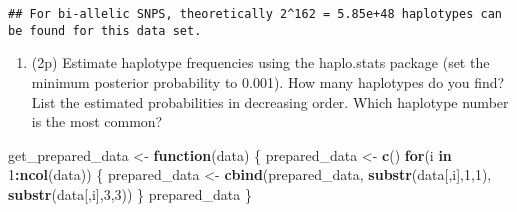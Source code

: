 \documentclass[
]{article}
\newenvironment{Shaded}{\begin{snugshade}}{\end{snugshade}}
\newcommand{\ControlFlowTok}[1]{\textcolor[rgb]{0.13,0.29,0.53}{\textbf{#1}}}
\newcommand{\DecValTok}[1]{\textcolor[rgb]{0.00,0.00,0.81}{#1}}
\newcommand{\KeywordTok}[1]{\textcolor[rgb]{0.13,0.29,0.53}{\textbf{#1}}}
\newcommand{\NormalTok}[1]{#1}
\newcommand{\OperatorTok}[1]{\textcolor[rgb]{0.81,0.36,0.00}{\textbf{#1}}}
\newcommand{\StringTok}[1]{\textcolor[rgb]{0.31,0.60,0.02}{#1}}
\providecommand{\tightlist}{%
  \setlength{\itemsep}{0pt}\setlength{\parskip}{0pt}}
\begin{document}
\begin{verbatim}
## For bi-allelic SNPS, theoretically 2^162 = 5.85e+48 haplotypes can be found for this data set.
\end{verbatim}

\begin{enumerate}
\def\labelenumi{\arabic{enumi}.}
\setcounter{enumi}{3}
\tightlist
\item
  (2p) Estimate haplotype frequencies using the haplo.stats package (set
  the minimum posterior probability to 0.001). How many haplotypes do
  you find? List the estimated probabilities in decreasing order. Which
  haplotype number is the most common?
\end{enumerate}

\begin{Shaded}
\begin{Highlighting}[]
\NormalTok{get_prepared_data <-}\StringTok{ }\ControlFlowTok{function}\NormalTok{(data) \{}
\NormalTok{  prepared_data <-}\StringTok{ }\KeywordTok{c}\NormalTok{()}
  \ControlFlowTok{for}\NormalTok{(i }\ControlFlowTok{in} \DecValTok{1}\OperatorTok{:}\KeywordTok{ncol}\NormalTok{(data)) \{}
\NormalTok{    prepared_data <-}\StringTok{ }\KeywordTok{cbind}\NormalTok{(prepared_data, }
                           \KeywordTok{substr}\NormalTok{(data[,i],}\DecValTok{1}\NormalTok{,}\DecValTok{1}\NormalTok{),}
                           \KeywordTok{substr}\NormalTok{(data[,i],}\DecValTok{3}\NormalTok{,}\DecValTok{3}\NormalTok{))}
\NormalTok{  \}}
\NormalTok{  prepared_data}
\NormalTok{\}}
\end{Highlighting}
\end{Shaded}
\end{document}
